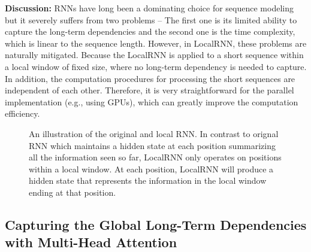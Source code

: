 \documentclass{article} \usepackage{iclr2019_conference,times}
\begin{document}
{\bf Discussion:} RNNs have long been a dominating choice for sequence modeling but it severely suffers from two problems -- The first one is its limited ability to capture the long-term dependencies and the second one is the time complexity, which is linear to the sequence length. However, in LocalRNN, these problems are naturally mitigated. Because the LocalRNN is applied to a short sequence within a local window of fixed size, where no long-term dependency is needed to capture. In addition, the computation procedures for processing the short sequences are independent of each other. Therefore, it is very straightforward for the parallel implementation (e.g., using GPUs), which can greatly improve the computation efficiency. 
\begin{figure}

	\begin{center}
	\end{center}
	\caption{An illustration of the original and local RNN. In contrast to orignal RNN which maintains a hidden state at each position summarizing all the information seen so far,  LocalRNN only operates on positions within a local window. At each position, LocalRNN will produce a hidden state that represents the information in the local window ending at that position.}
	\label{fig:rnn}
\end{figure}

\subsection{Capturing the Global Long-Term Dependencies with Multi-Head Attention}
\end{document}
